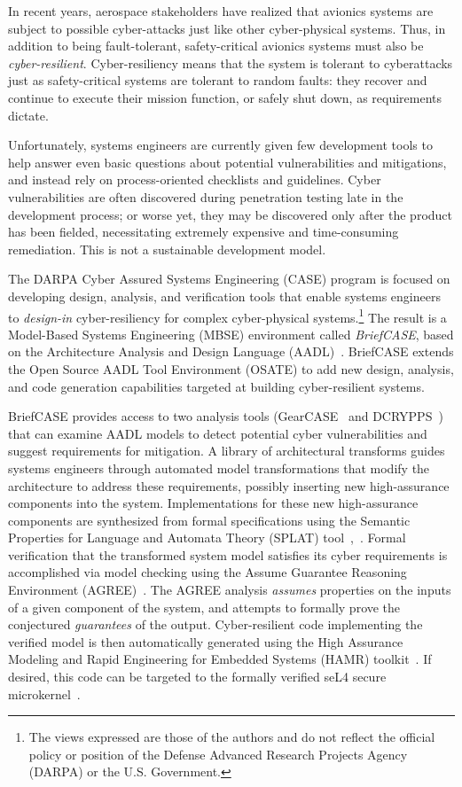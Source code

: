 In recent years, aerospace stakeholders have realized that avionics systems are subject to possible cyber-attacks just like other cyber-physical systems.  Thus, in addition to being fault-tolerant, safety-critical avionics systems must also be {\em cyber-resilient}. Cyber-resiliency means that the system is tolerant to cyberattacks just as safety-critical systems are tolerant to random faults: they recover and continue to execute their mission function, or safely shut down, as requirements dictate. 

Unfortunately, systems engineers are currently given few development tools to help answer even basic questions about potential vulnerabilities and mitigations, and instead rely on process-oriented checklists and guidelines.  Cyber vulnerabilities are often discovered during penetration testing late in the development process; or worse yet, they may be discovered only after the product has been fielded, necessitating extremely expensive and time-consuming remediation. This is not a sustainable development model.

The DARPA Cyber Assured Systems Engineering (CASE) program is focused on developing design, analysis, and verification tools that enable systems engineers to {\em design-in} cyber-resiliency for complex cyber-physical systems.\footnote{The
  views expressed are those of the authors and do not reflect the
  official policy or position of the Defense Advanced
  Research Projects Agency (DARPA) or the U.S. Government.}
The result is a Model-Based Systems Engineering (MBSE) environment called {\em BriefCASE}, based on the Architecture Analysis and Design Language (AADL)~\cite{aadl}.  BriefCASE extends the Open Source AADL Tool Environment (OSATE) to add new design, analysis, and code generation capabilities targeted at building cyber-resilient systems.  

BriefCASE provides access to two analysis tools (GearCASE~\cite{gearcase2020} and DCRYPPS~\cite{dcrypps2019}) that can examine AADL models to detect potential cyber vulnerabilities and suggest requirements for mitigation.  
A library of architectural transforms guides systems engineers through automated model transformations that modify the architecture to address these requirements, possibly inserting new high-assurance components into the system. 
Implementations for these new high-assurance components are synthesized from formal specifications using the Semantic Properties for Language and Automata Theory (SPLAT) tool~\cite{slind-hcss2020},~\cite{formal-filter-synth-langsec}.
Formal verification that the transformed system model satisfies its cyber requirements is accomplished via model checking using the Assume Guarantee Reasoning Environment (AGREE)~\cite{agree2013}.  The AGREE analysis \emph{assumes}  properties on the inputs of a given component of the system, and attempts to formally prove the conjectured \emph{guarantees} of the output.  Cyber-resilient code implementing the verified model is then automatically generated using the High Assurance Modeling and Rapid Engineering for Embedded Systems (HAMR) toolkit~\cite{hamr}.  If desired, this code can be targeted to the formally verified seL4 secure microkernel~\cite{sel4-2009}.


